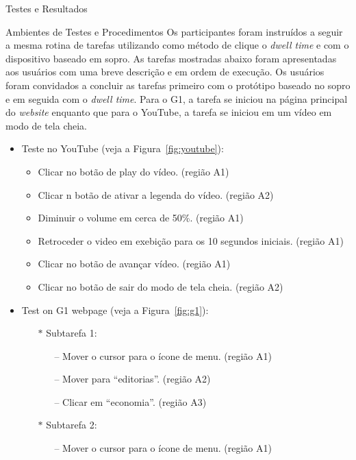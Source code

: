 \begin{chapter}{Testes e Resultados}
\begin{section}{Ambientes de Testes e Procedimentos}
Os participantes foram instruídos a seguir a mesma rotina de tarefas utilizando
como método de clique o \textit{dwell time} e com o dispositivo baseado em
sopro. As tarefas mostradas abaixo foram apresentadas aos usuários com uma breve
descrição e em ordem de execução. Os usuários foram convidados a concluir as
tarefas primeiro com o protótipo baseado no sopro e em seguida com o
\textit{dwell time}.  Para o G1, a tarefa se iniciou na página
principal do \textit{website} enquanto que para o YouTube, a tarefa se iniciou
em um vídeo em modo de tela cheia.

\begin{itemize}
\item Teste no YouTube (veja a Figura~\ref{fig:youtube}):
	\begin{itemize}
	\renewcommand\labelitemi{--}
	\item Clicar no botão de play do vídeo.                            \hfill (região A1)
	\item Clicar n botão de ativar a legenda do vídeo.                 \hfill (região A2)
	\item Diminuir o volume em cerca de 50\%.                          \hfill (região A1)
	\item Retroceder o video em exebição para os 10 segundos iniciais. \hfill (região A1)
	\item Clicar no botão de avançar vídeo.                            \hfill (região A1)
	\item Clicar no botão de sair do modo de tela cheia.               \hfill (região A2)
	\end{itemize}
\item Test on G1 webpage (veja a Figura~\ref{fig:g1}):
	\begin{itemize}
	\item[$\ast$] Subtarefa 1:
		\begin{itemize}
		\item[--] Mover o cursor para o ícone de menu.                   \hfill (região A1)
		\item[--] Mover para ``editorias''.                              \hfill (região A2)
		\item[--] Clicar em ``economia''.                                \hfill (região A3)
		\end{itemize}
	\item[$\ast$] Subtarefa 2:
		\begin{itemize}
		\item[--] Mover o cursor para o ícone de menu.                   \hfill (região A1)

\end{itemize}
\end{itemize}
\end{itemize}
\end{section}
\end{chapter}
